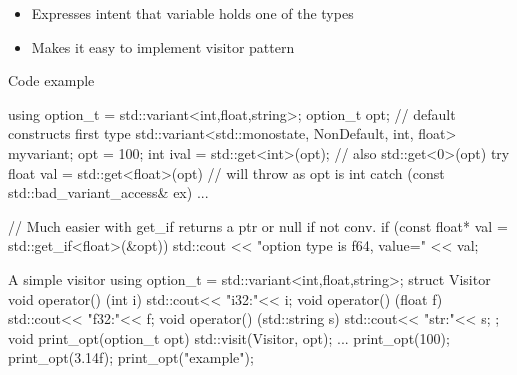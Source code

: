 \begin{frame}[fragile]
  \begin{itemize}
  \item Expresses intent that variable holds one of the types
  \item Makes it easy to implement visitor pattern
  \end{itemize}

  \begin{exampleblock}{Code example}
    \begin{cppcode*}{}
      using option_t = std::variant<int,float,string>;
      option_t opt; // default constructs first type
      std::variant<std::monostate, NonDefault, int, float> myvariant;
      opt = 100;
      int ival = std::get<int>(opt); // also std::get<0>(opt)
      try {
        float val = std::get<float>(opt) // will throw as opt is int
      } catch (const std::bad_variant_access& ex) {...}

      // Much easier with get_if returns a ptr or null if not conv.
      if (const float* val = std::get_if<float>(&opt))
          std::cout << "option type is f64, value=" << val;
    \end{cppcode*}
  \end{exampleblock}

\end{frame}

\begin{frame}[fragile]
    \begin{cppcode*}{A simple visitor}
      using option_t = std::variant<int,float,string>;
      struct Visitor {
        void operator() (int i) { std::cout<< "i32:"<< i;}
        void operator() (float f) { std::cout<< "f32:"<< f;}
        void operator() (std::string s) { std::cout<< "str:"<< s;}
      };
      void print_opt(option_t opt) {
        std::visit(Visitor{}, opt);
      }
      ...
      print_opt(100); print_opt(3.14f); print_opt("example");
    \end{cppcode*}
\end{frame}

